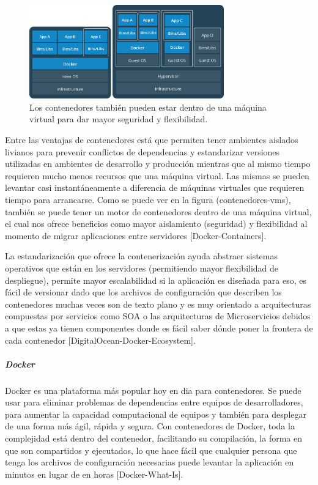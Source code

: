 \begin{figure}
  \begin{center}
      \includegraphics[width=0.75\textwidth]{Figures/contenedores-vms.png}
  \end{center}
  \caption{Los contenedores también pueden estar dentro de una máquina virtual para dar mayor seguridad y flexibilidad.} 
  \label{contenedores-vms}
\end{figure}

Entre las ventajas de contenedores está que permiten tener ambientes aislados livianos para prevenir conflictos de dependencias y estandarizar versiones utilizadas en ambientes de desarrollo y producción mientras que al mismo tiempo requieren mucho menos recursos que una máquina virtual. Las mismas se pueden levantar casi instantáneamente a diferencia de máquinas virtuales que requieren tiempo para arrancarse. Como se puede ver en la figura (contenedores-vms), también se puede tener un motor de contenedores dentro de una máquina virtual, el cual nos ofrece beneficios como mayor aislamiento (seguridad) y flexibilidad al momento de migrar aplicaciones entre servidores [Docker-Containers].

La estandarización que ofrece la contenerización ayuda abstraer sistemas operativos que están en los servidores (permitiendo mayor flexibilidad de despliegue),  permite mayor escalabilidad si la aplicación es diseñada para eso, es fácil de versionar dado que los archivos de configuración que describen los contenedores muchas veces son de texto plano y es muy orientado a arquitecturas compuestas por servicios como SOA o las arquitecturas de Microservicios debidos a que estas ya tienen componentes donde es fácil saber dónde poner la frontera de cada contenedor [DigitalOcean-Docker-Ecosystem].

\subparagraph{Docker}
Docker es una plataforma más popular hoy en dia para contenedores. Se puede usar para eliminar problemas de dependencias entre equipos de desarrolladores, para aumentar la capacidad computacional de equipos y también para desplegar de una forma más ágil, rápida y segura. Con contenedores de Docker, toda la complejidad está dentro del contenedor, facilitando su compilación, la forma en que son compartidos y ejecutados, lo que hace fácil que cualquier persona que tenga los archivos de configuración necesarias puede levantar la aplicación en minutos en lugar de en horas [Docker-What-Is].

